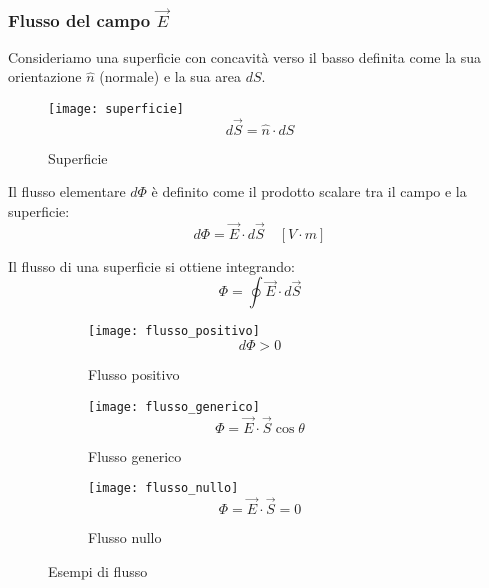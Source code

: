 \documentclass[a4paper]{article}
\begin{document}
\subsubsection{Flusso del campo \texorpdfstring{\( \vec{E} \)}{E}}
Consideriamo una superficie con concavità verso il basso definita come la sua orientazione
\( \hat{n} \) (normale) e la sua area \( dS \).
\begin{figure}[H]
  \centering
  \texttt{[image: superficie]}
  \[
    d\vec{S} = \hat{n} \cdot dS
  \] 
  \caption{Superficie}
\end{figure}
\begin{definition}
  Il flusso elementare \( d \Phi \) è definito come il prodotto scalare tra il campo
  e la superficie:
  \[
    d \Phi = \vec{E} \cdot d \vec{S} \quad \left[ V \cdot m \right]
  \] 

  \vspace{1em}
  \noindent
  Il flusso di una superficie si ottiene integrando:
  \[
    \Phi = \oint \vec{E} \cdot d \vec{S}
  \] 
  \begin{figure}[H]
    \centering
    \begin{subfigure}{0.3\textwidth}
      \texttt{[image: flusso\_positivo]}
      \[
        d \Phi > 0
      \] 
      \caption{Flusso positivo}
    \end{subfigure}
    \hfil
    \begin{subfigure}{0.3\textwidth}
      \texttt{[image: flusso\_generico]}
      \[
       \Phi = \vec{E} \cdot \vec{S} \cos \theta
      \] 
      \caption{Flusso generico}
    \end{subfigure}
    \hfil
    \begin{subfigure}{0.3\textwidth}
      \texttt{[image: flusso\_nullo]}
      \[
        \Phi = \vec{E} \cdot \vec{S} = 0
      \] 
      \caption{Flusso nullo}
    \end{subfigure}
    \caption{Esempi di flusso}
  \end{figure}
\end{definition}
\end{document}
